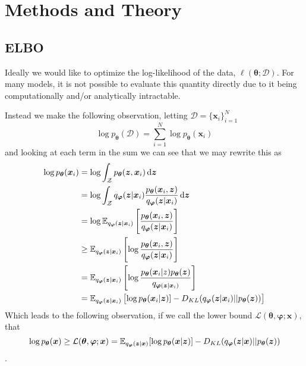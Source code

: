 \chapter{Methods and Theory}
\label{MethodsCh}

\section{ELBO}

Ideally we would like to optimize the log-likelihood of the data,
$\ell(\bm{\theta} ; \mathcal{D})$. For many models, it is not possible to
evaluate this quantity directly due to it being computationally and/or
analytically intractable.

Instead we make the following observation, letting $\mathcal{D} = \{\bm{x}_i\}_{i=1}^N$
\begin{equation}
  \label{eq:log_likelihood_sum}
  \log p_{\bm{\theta}}(\mathcal{D}) = \sum_{i=1}^N \log p_{\bm{\theta}}(\bm{x}_i)
\end{equation}
and looking at each term in the sum we can see that we may rewrite this as
\begin{align*}
  \log p_{\bm{\theta}}(\bm{x}_i) & = \log \int_{\mathcal{Z}} p_{\bm{\theta}}(\bm{z}, \bm{x}_i) \dif \bm{z}\\
                               & = \log \int_{\mathcal{Z}}q_{\bm{\varphi}}(\bm{z} | \bm{x}_i)  \frac{p_{\bm{\theta}}(\bm{x}_i, \bm{z})}{q_{\bm{\varphi}}(\bm{z} | \bm{x}_i)} \dif \bm{z} \\
                               & = \log \E_{q_{\bm{\varphi}}(\bm{z} | \bm{x}_i)}\left[\frac{p_{\bm{\theta}}(\bm{x}_i, \bm{z})}{q_{\bm{\varphi}}(\bm{z} | \bm{x}_i)}\right] \\
                               & \geq \E_{q_{\bm{\varphi}}(\bm{z} | \bm{x}_i)}\left[\log \frac{p_{\bm{\theta}}(\bm{x}_i, \bm{z})}{q_{\bm{\varphi}}(\bm{z} | \bm{x}_i)}\right] \\
                               & = \E_{q_{\bm{\varphi}}(\bm{z} | \bm{x}_i)}\left[\log \frac{p_{\bm{\theta}}(\bm{x}_i | z) p_{\bm{\theta}}(\bm{z})}{q_{\bm{\varphi}(\bm{z} | \bm{x}_i)}}\right] \\
                               & = \E_{q_{\bm{\varphi}}(\bm{z} | \bm{x}_i)}\left[\log p_{\bm{\theta}}(\bm{x}_i | \bm{z})] - \KL{q_{\bm{\varphi}}(\bm{z} | \bm{x}_i)}{p_{\bm{\theta}}(\bm{z})}\right]
\end{align*}
Which leads to the following observation, if we call the lower bound
$\mathcal{L}(\bm{\theta}, \bm{\varphi}; \bm{x})$, that
\begin{equation}
  \label{eq:ELBO_inequality}
  \log p_{\bm{\theta}}(\bm{x}) \geq \mathcal{L}(\bm{\theta}, \bm{\varphi}; \bm{x}) = \operatorname{\mathbb{E}}_{q_{\bm{\varphi}}(\bm{z} | \bm{x})}[\log p_{\bm{\theta}}(\bm{x} | \bm{z})] - D_{KL}(q_{\bm{\varphi}}(\bm{z} | \bm{x}) || p_{\bm{\theta}}(\bm{z}))
\end{equation}.

